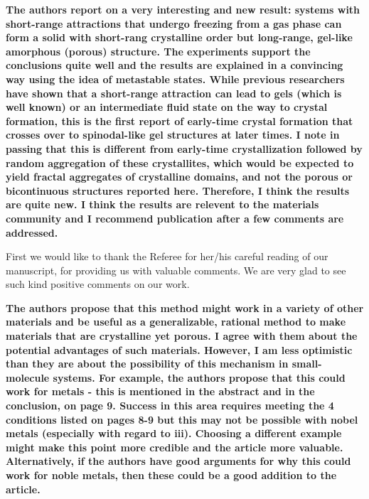 \documentclass[11pt]{article}
\begin{document}
{\bf
The authors report on a very interesting and new result: systems with short-range attractions that undergo freezing from a gas phase can form a solid with short-rang crystalline order but long-range, gel-like amorphous (porous) structure. The experiments support the conclusions quite well and the results are explained in a convincing way using the idea of metastable states. While previous researchers have shown that a short-range attraction can lead to gels (which is well known) or an intermediate fluid state on the way to crystal formation, this is the first report of early-time crystal formation that crosses over to spinodal-like gel structures at later times. I note in passing that this is different from early-time crystallization followed by random aggregation of these crystallites, which would be expected to yield fractal aggregates of crystalline domains, and not the porous or bicontinuous structures reported here. Therefore, I think the results are quite new. I think the results are relevent to the 
materials community and I recommend publication after a few comments are addressed.
}


\bigskip
\doublespacing

First we would like to thank the Referee for her/his careful reading of our manuscript, for providing us with valuable comments. We are very glad to see such kind positive comments on our work.


\vspace{1em}

\singlespacing

{\bf
The authors propose that this method might work in a variety of other materials and be useful as a generalizable, rational method to make materials that are crystalline yet porous. I agree with them about the potential advantages of such materials. However, I am less optimistic than they are about the possibility of this mechanism in small-molecule systems. For example, the authors propose that this could work for metals - this is mentioned in the abstract and in the conclusion, on page 9. Success in this area requires meeting the 4 conditions listed on pages 8-9 but this may not be possible with nobel metals (especially with regard to iii). Choosing a different example might make this point more credible and the article more valuable. Alternatively, if the authors have good arguments for why this could work for noble metals, then these could be a good addition to the article.
}



\bigskip
\doublespacing
\end{document}
